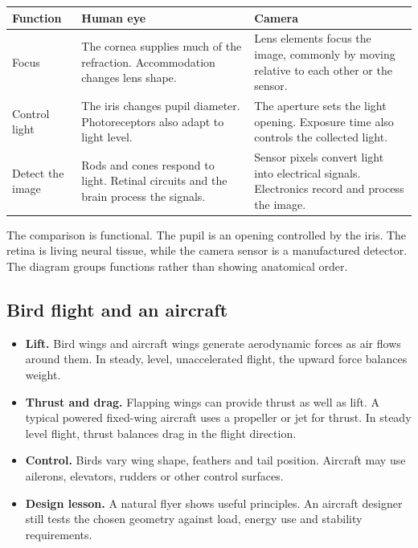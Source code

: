 \documentclass[12pt,a4paper]{article}
\begin{document}
\par\vspace{5pt}
\begingroup
\setlength{\extrarowheight}{1pt}
\noindent\begin{tabularx}{\linewidth}{|B{3cm}|Y|Y|}
\hline
\textbf{Function} & \textbf{Human eye} & \textbf{Camera} \\ \hline
Focus & The cornea supplies much of the refraction. Accommodation changes lens shape. & Lens elements focus the image, commonly by moving relative to each other or the sensor. \\ \hline
Control light & The iris changes pupil diameter. Photoreceptors also adapt to light level. & The aperture sets the light opening. Exposure time also controls the collected light. \\ \hline
Detect the image & Rods and cones respond to light. Retinal circuits and the brain process the signals. & Sensor pixels convert light into electrical signals. Electronics record and process the image. \\ \hline
\end{tabularx}\par
\endgroup
\begin{tcolorbox}[masonbox, title={State the limits of the analogy}]
The comparison is functional. The pupil is an opening controlled by the iris. The retina is living neural tissue, while the camera sensor is a manufactured detector. The diagram groups functions rather than showing anatomical order.
\end{tcolorbox}

\subsection{Bird flight and an aircraft}
\begin{itemize}[leftmargin=*, itemsep=3pt, topsep=4pt]
  \item \textbf{Lift.} Bird wings and aircraft wings generate aerodynamic forces as air flows around them. In steady, level, unaccelerated flight, the upward force balances weight.
  \item \textbf{Thrust and drag.} Flapping wings can provide thrust as well as lift. A typical powered fixed-wing aircraft uses a propeller or jet for thrust. In steady level flight, thrust balances drag in the flight direction.
  \item \textbf{Control.} Birds vary wing shape, feathers and tail position. Aircraft may use ailerons, elevators, rudders or other control surfaces.
  \item \textbf{Design lesson.} A natural flyer shows useful principles. An aircraft designer still tests the chosen geometry against load, energy use and stability requirements.
\end{itemize}
\end{document}

